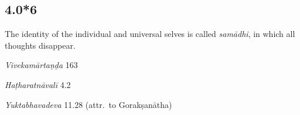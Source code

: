 \begin{ekdosis}

\subsection*{4.0*6}
\begin{translation}[hp04_000_6]
The identity of the individual and universal selves is called \emph{samādhi}, in which all thoughts disappear.
\end{translation}

\begin{sources}[hp04_000_6]
\emph{Vivekamārtaṇḍa} 163
\begin{versinnote}
\end{versinnote}
\end{sources}

\begin{testimonia}[hp04_000_6]
\emph{Haṭharatnāvalī} 4.2
\begin{versinnote}
\end{versinnote}

\emph{Yuktabhavadeva} 11.28 (attr.~to Gorakṣanātha)
\begin{versinnote}
\end{versinnote}

\end{testimonia}




\end{ekdosis}
